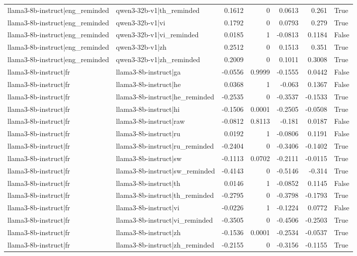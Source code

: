\begin{table}
\begin{tabular}{l l r r r r l}
llama3-8b-instruct|eng_reminded & qwen3-32b-v1|th_reminded & 0.1612 & 0 & 0.0613 & 0.261 & True \\
llama3-8b-instruct|eng_reminded & qwen3-32b-v1|vi & 0.1792 & 0 & 0.0793 & 0.279 & True \\
llama3-8b-instruct|eng_reminded & qwen3-32b-v1|vi_reminded & 0.0185 & 1 & -0.0813 & 0.1184 & False \\
llama3-8b-instruct|eng_reminded & qwen3-32b-v1|zh & 0.2512 & 0 & 0.1513 & 0.351 & True \\
llama3-8b-instruct|eng_reminded & qwen3-32b-v1|zh_reminded & 0.2009 & 0 & 0.1011 & 0.3008 & True \\
llama3-8b-instruct|fr & llama3-8b-instruct|ga & -0.0556 & 0.9999 & -0.1555 & 0.0442 & False \\
llama3-8b-instruct|fr & llama3-8b-instruct|he & 0.0368 & 1 & -0.063 & 0.1367 & False \\
llama3-8b-instruct|fr & llama3-8b-instruct|he_reminded & -0.2535 & 0 & -0.3537 & -0.1533 & True \\
llama3-8b-instruct|fr & llama3-8b-instruct|hi & -0.1506 & 0.0001 & -0.2505 & -0.0508 & True \\
llama3-8b-instruct|fr & llama3-8b-instruct|raw & -0.0812 & 0.8113 & -0.181 & 0.0187 & False \\
llama3-8b-instruct|fr & llama3-8b-instruct|ru & 0.0192 & 1 & -0.0806 & 0.1191 & False \\
llama3-8b-instruct|fr & llama3-8b-instruct|ru_reminded & -0.2404 & 0 & -0.3406 & -0.1402 & True \\
llama3-8b-instruct|fr & llama3-8b-instruct|sw & -0.1113 & 0.0702 & -0.2111 & -0.0115 & True \\
llama3-8b-instruct|fr & llama3-8b-instruct|sw_reminded & -0.4143 & 0 & -0.5146 & -0.314 & True \\
llama3-8b-instruct|fr & llama3-8b-instruct|th & 0.0146 & 1 & -0.0852 & 0.1145 & False \\
llama3-8b-instruct|fr & llama3-8b-instruct|th_reminded & -0.2795 & 0 & -0.3798 & -0.1793 & True \\
llama3-8b-instruct|fr & llama3-8b-instruct|vi & -0.0226 & 1 & -0.1224 & 0.0772 & False \\
llama3-8b-instruct|fr & llama3-8b-instruct|vi_reminded & -0.3505 & 0 & -0.4506 & -0.2503 & True \\
llama3-8b-instruct|fr & llama3-8b-instruct|zh & -0.1536 & 0.0001 & -0.2534 & -0.0537 & True \\
llama3-8b-instruct|fr & llama3-8b-instruct|zh_reminded & -0.2155 & 0 & -0.3156 & -0.1155 & True \\

\end{tabular}
\end{table}
